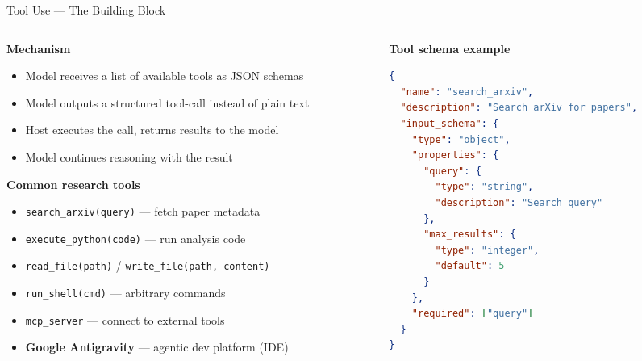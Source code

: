 \begin{frame}[fragile]{Tool Use — The Building Block}
  \begin{columns}[T, onlytextwidth]
    \begin{column}{0.55\textwidth}
      \textbf{Mechanism}\\[0.3em]
      \begin{itemize}
        \item Model receives a list of available tools as JSON schemas
        \item Model outputs a structured tool-call instead of plain text
        \item Host executes the call, returns results to the model
        \item Model continues reasoning with the result~\parencite{schick2023toolformer}
      \end{itemize}
      \vspace{0.5em}
      \textbf{Common research tools}\\[0.3em]
      \begin{itemize}
        \item \texttt{search\_arxiv(query)} — fetch paper metadata
        \item \texttt{execute\_python(code)} — run analysis code
        \item \texttt{read\_file(path)} / \texttt{write\_file(path, content)}
        \item \texttt{run\_shell(cmd)} — arbitrary commands
        \item \texttt{mcp\_server} — connect to external tools
        \item \textbf{Google Antigravity} — agentic dev platform (IDE)
      \end{itemize}
    \end{column}
    \hfill
    \begin{column}{0.42\textwidth}
      \textbf{Tool schema example}\\[0.3em]
      \begin{lstlisting}[language=json, numbers=none, basicstyle=\ttfamily\scriptsize]
{
  "name": "search_arxiv",
  "description": "Search arXiv for papers",
  "input_schema": {
    "type": "object",
    "properties": {
      "query": {
        "type": "string",
        "description": "Search query"
      },
      "max_results": {
        "type": "integer",
        "default": 5
      }
    },
    "required": ["query"]
  }
}
      \end{lstlisting}
    \end{column}
  \end{columns}
\end{frame}

